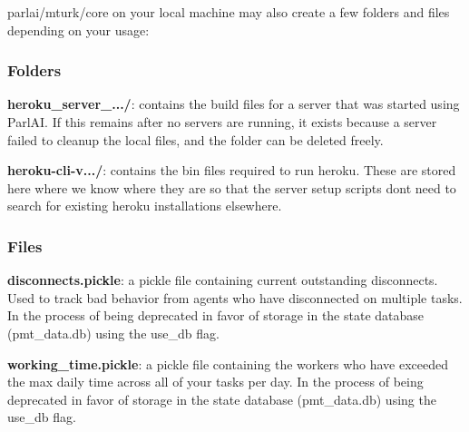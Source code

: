 parlai/mturk/core on your local machine may also create a few folders and files depending on your usage\+:

\subsubsection*{Folders}


\begin{DoxyItemize}
\item {\bfseries heroku\+\_\+server\+\_\+.../}\+: contains the build files for a server that was started using Parl\+AI. If this remains after no servers are running, it exists because a server failed to cleanup the local files, and the folder can be deleted freely.
\item {\bfseries heroku-\/cli-\/v.../}\+: contains the bin files required to run heroku. These are stored here where we know where they are so that the server setup scripts don\textquotesingle{}t need to search for existing heroku installations elsewhere.
\end{DoxyItemize}

\subsubsection*{Files}


\begin{DoxyItemize}
\item {\bfseries disconnects.\+pickle}\+: a pickle file containing current outstanding disconnects. Used to track bad behavior from agents who have disconnected on multiple tasks. In the process of being deprecated in favor of storage in the state database ({\ttfamily pmt\+\_\+data.\+db}) using the {\ttfamily use\+\_\+db} flag.
\item {\bfseries working\+\_\+time.\+pickle}\+: a pickle file containing the workers who have exceeded the max daily time across all of your tasks per day. In the process of being deprecated in favor of storage in the state database ({\ttfamily pmt\+\_\+data.\+db}) using the {\ttfamily use\+\_\+db} flag. 
\end{DoxyItemize}